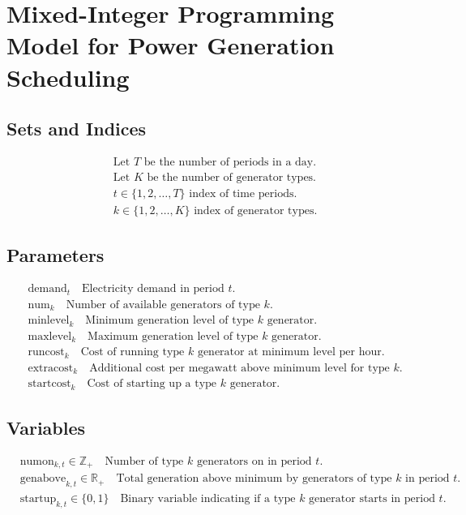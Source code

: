 \documentclass{article}
\begin{document}
\section*{Mixed-Integer Programming Model for Power Generation Scheduling}

\subsection*{Sets and Indices}
\begin{align*}
    & \text{Let } T \text{ be the number of periods in a day.} \\
    & \text{Let } K \text{ be the number of generator types.} \\
    & t \in \{1, 2, \ldots, T\} \text{ index of time periods.} \\
    & k \in \{1, 2, \ldots, K\} \text{ index of generator types.}
\end{align*}

\subsection*{Parameters}
\begin{align*}
    & \text{demand}_{t} \quad  \text{Electricity demand in period } t. \\
    & \text{num}_{k} \quad \text{Number of available generators of type } k. \\
    & \text{minlevel}_{k} \quad \text{Minimum generation level of type } k \text{ generator.} \\
    & \text{maxlevel}_{k} \quad \text{Maximum generation level of type } k \text{ generator.} \\
    & \text{runcost}_{k} \quad \text{Cost of running type } k \text{ generator at minimum level per hour.} \\
    & \text{extracost}_{k} \quad \text{Additional cost per megawatt above minimum level for type } k. \\
    & \text{startcost}_{k} \quad \text{Cost of starting up a type } k \text{ generator.}
\end{align*}

\subsection*{Variables}
\begin{align*}
    & \text{numon}_{k,t} \in \mathbb{Z}_+ \quad \text{Number of type } k \text{ generators on in period } t. \\
    & \text{genabove}_{k,t} \in \mathbb{R}_+ \quad \text{Total generation above minimum by generators of type } k \text{ in period } t. \\
    & \text{startup}_{k,t} \in \{0, 1\} \quad \text{Binary variable indicating if a type } k \text{ generator starts in period } t.
\end{align*}
\end{document}
